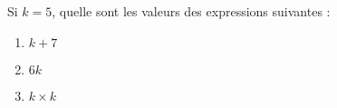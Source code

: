 
\begin{exercice}\label{exo2smath-0072}

    Si \( k=5\), quelle sont les valeurs des expressions suivantes :
    \begin{multicols}{3}
    \begin{enumerate}
        \item
            \( k+7\)
        \item
            \( 6k\)
        \item
            \( k\times k\)
    \end{enumerate}
    \end{multicols}

\end{exercice}
